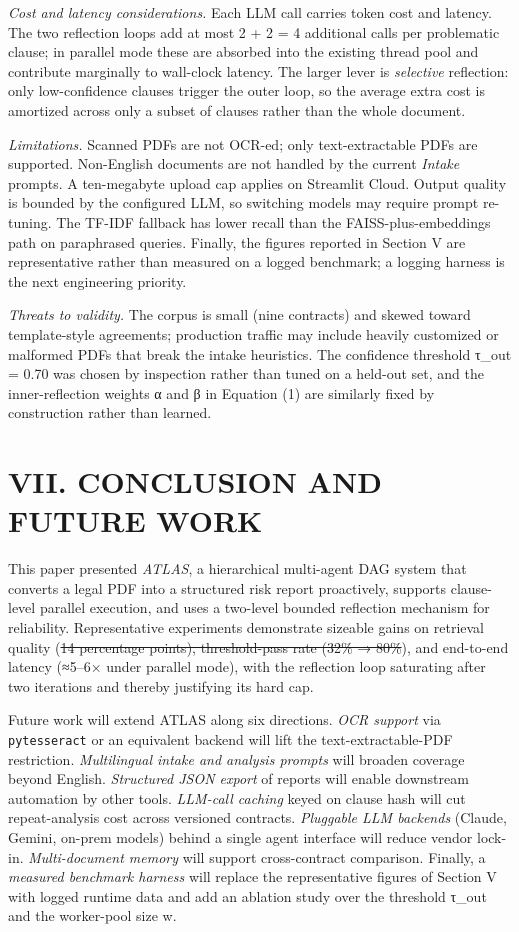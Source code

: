 \documentclass[
  twocolumn]{article}
\begin{document}
\emph{Cost and latency considerations.} Each LLM call carries token cost
and latency. The two reflection loops add at most 2 + 2 = 4 additional
calls per problematic clause; in parallel mode these are absorbed into
the existing thread pool and contribute marginally to wall-clock
latency. The larger lever is \emph{selective} reflection: only
low-confidence clauses trigger the outer loop, so the average extra cost
is amortized across only a subset of clauses rather than the whole
document.

\emph{Limitations.} Scanned PDFs are not OCR-ed; only text-extractable
PDFs are supported. Non-English documents are not handled by the current
\emph{Intake} prompts. A ten-megabyte upload cap applies on Streamlit
Cloud. Output quality is bounded by the configured LLM, so switching
models may require prompt re-tuning. The TF-IDF fallback has lower
recall than the FAISS-plus-embeddings path on paraphrased queries.
Finally, the figures reported in Section V are representative rather
than measured on a logged benchmark; a logging harness is the next
engineering priority.

\emph{Threats to validity.} The corpus is small (nine contracts) and
skewed toward template-style agreements; production traffic may include
heavily customized or malformed PDFs that break the intake heuristics.
The confidence threshold τ\_out = 0.70 was chosen by inspection rather
than tuned on a held-out set, and the inner-reflection weights α and β
in Equation (1) are similarly fixed by construction rather than learned.

\section{VII. CONCLUSION AND FUTURE
WORK}\label{vii.-conclusion-and-future-work}

This paper presented \emph{ATLAS}, a hierarchical multi-agent DAG system
that converts a legal PDF into a structured risk report proactively,
supports clause-level parallel execution, and uses a two-level bounded
reflection mechanism for reliability. Representative experiments
demonstrate sizeable gains on retrieval quality (\st{14 percentage
points), threshold-pass rate (32\% → 80\%}), and end-to-end latency
(≈5--6× under parallel mode), with the reflection loop saturating after
two iterations and thereby justifying its hard cap.

Future work will extend ATLAS along six directions. \emph{OCR support}
via \texttt{pytesseract} or an equivalent backend will lift the
text-extractable-PDF restriction. \emph{Multilingual intake and analysis
prompts} will broaden coverage beyond English. \emph{Structured JSON
export} of reports will enable downstream automation by other tools.
\emph{LLM-call caching} keyed on clause hash will cut repeat-analysis
cost across versioned contracts. \emph{Pluggable LLM backends} (Claude,
Gemini, on-prem models) behind a single agent interface will reduce
vendor lock-in. \emph{Multi-document memory} will support cross-contract
comparison. Finally, a \emph{measured benchmark harness} will replace
the representative figures of Section V with logged runtime data and add
an ablation study over the threshold τ\_out and the worker-pool size w.
\end{document}
